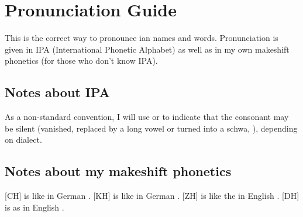 \chapter{Pronunciation Guide}
\label{PronunIPA}




\indent 
This is the correct way to pronounce \Miith{}ian names and words. Pronunciation is given in IPA (International Phonetic Alphabet) as well as in my own makeshift phonetics (for those who don't know IPA). 









\section{Notes about IPA}
As a non-standard convention, I will use \txipa{[(\rr)]} or \txipa{[(\gr)]} to indicate that the consonant may be silent (vanished, replaced by a long vowel or turned into a schwa, \txipa{[@]}), depending on dialect. 









\section{Notes about my makeshift phonetics}
[CH] is like in German . 
[KH] is like in German . 
[ZH] is like the  in English . 
[DH] is as in English . 

